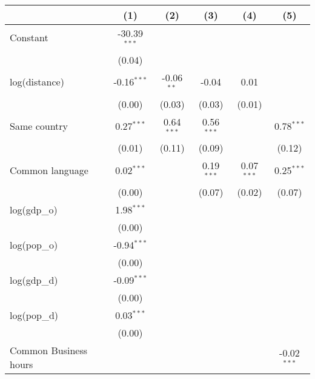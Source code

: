 
\begingroup
\centering
\small
\begin{tabular}{lccccc}
   \toprule
                               & (1)            & (2)          & (3)          & (4)          & (5)\\  
   \midrule 
   Constant                    & -30.39$^{***}$ &              &              &              &   \\   
                               & (0.04)         &              &              &              &   \\   
   log(distance)               & -0.16$^{***}$  & -0.06$^{**}$ & -0.04        & 0.01         &   \\   
                               & (0.00)         & (0.03)       & (0.03)       & (0.01)       &   \\   
   Same country                & 0.27$^{***}$   & 0.64$^{***}$ & 0.56$^{***}$ &              & 0.78$^{***}$\\   
                               & (0.01)         & (0.11)       & (0.09)       &              & (0.12)\\   
   Common language             & 0.02$^{***}$   &              & 0.19$^{***}$ & 0.07$^{***}$ & 0.25$^{***}$\\   
                               & (0.00)         &              & (0.07)       & (0.02)       & (0.07)\\   
   log(gdp\_o)                 & 1.98$^{***}$   &              &              &              &   \\   
                               & (0.00)         &              &              &              &   \\   
   log(pop\_o)                 & -0.94$^{***}$  &              &              &              &   \\   
                               & (0.00)         &              &              &              &   \\   
   log(gdp\_d)                 & -0.09$^{***}$  &              &              &              &   \\   
                               & (0.00)         &              &              &              &   \\   
   log(pop\_d)                 & 0.03$^{***}$   &              &              &              &   \\   
                               & (0.00)         &              &              &              &   \\   
   Common Business hours       &                &              &              &              & -0.02$^{***}$\\   

\end{tabular}
